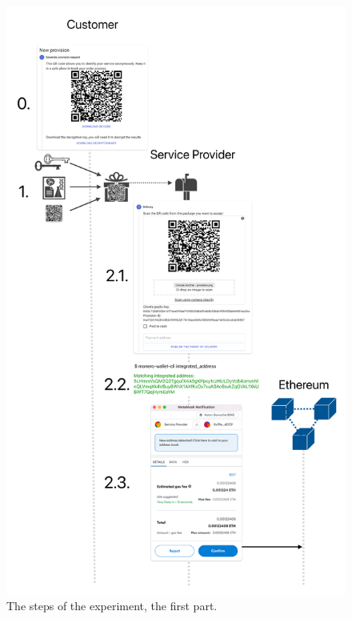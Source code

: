 \documentclass[pdftex,twocolumn,epjc3]{svjour3}
\begin{document}
{\begin{figure}
  \includegraphics[height=0.95\textheight,keepaspectratio]{anonser-experiment1.pdf}
  \caption{The steps of the experiment, the first part.}\label{fig:anonser-experiment1}
\end{figure}

}
\end{document}
